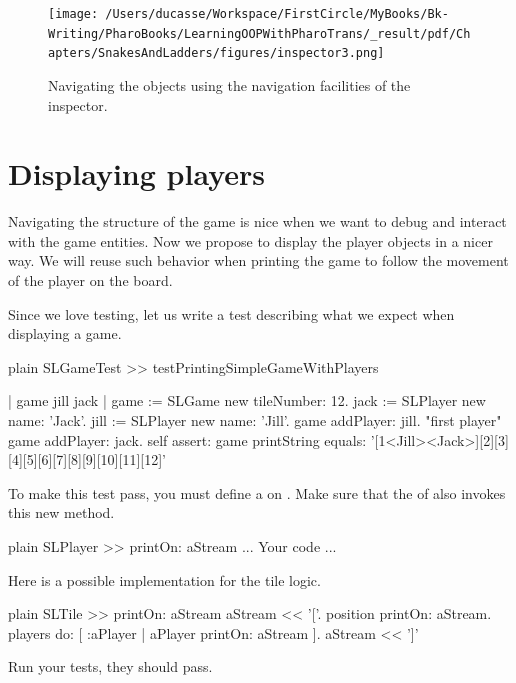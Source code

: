 \documentclass[10pt,twoside,english]{_support/latex/sbabook/sbabook}
\begin{document}
\begin{figure}

\begin{center}
\texttt{[image: /Users/ducasse/Workspace/FirstCircle/MyBooks/Bk-Writing/PharoBooks/LearningOOPWithPharoTrans/\_result/pdf/Chapters/SnakesAndLadders/figures/inspector3.png]}\caption{Navigating the objects using the navigation facilities of the inspector.\label{fig:ginspector3}}\end{center}
\end{figure}

\section{Displaying players}
Navigating the structure of the game is nice when we want to debug and interact with the game entities. Now we propose to display the player objects in a nicer way. We will reuse such behavior when printing the game to follow the movement of the player on the board. 

Since we love testing, let us write a test describing what we expect when displaying a game. 

\begin{displaycode}{plain}
SLGameTest >> testPrintingSimpleGameWithPlayers

	| game jill jack |
	game := SLGame new tileNumber: 12.
	jack := SLPlayer new name: 'Jack'.
	jill := SLPlayer new name: 'Jill'.
	game addPlayer: jill. "first player" 
	game addPlayer: jack. 
	self 
		assert: game printString 
		equals: '[1<Jill><Jack>][2][3][4][5][6][7][8][9][10][11][12]'
\end{displaycode}

To make this test pass, you must define a  on . Make sure that the  of  also invokes this new method.

\begin{displaycode}{plain}
SLPlayer >> printOn: aStream
	... Your code ...
\end{displaycode}

Here is a possible implementation for the tile logic. 

\begin{displaycode}{plain}
SLTile >> printOn: aStream
	aStream << '['.
	position printOn: aStream.
	players do: [ :aPlayer | aPlayer printOn: aStream ].
	aStream << ']'
\end{displaycode}

Run your tests, they should pass.
\end{document}
